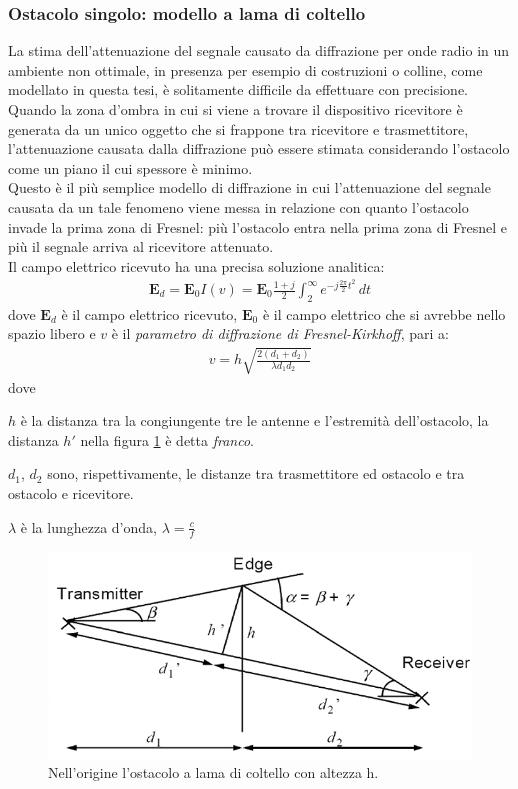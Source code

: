 \subsubsection*{Ostacolo singolo: modello a lama di coltello}
La stima dell’attenuazione del segnale causato da diffrazione per onde radio in un ambiente non ottimale, in presenza per esempio di 
costruzioni o colline, come modellato in questa tesi, è solitamente difficile da effettuare con precisione. Quando la zona d'ombra in 
cui si viene a trovare il dispositivo ricevitore è generata da un unico oggetto che si frappone tra ricevitore e trasmettitore, 
l'attenuazione causata dalla diffrazione può essere stimata considerando l'ostacolo come un piano il cui spessore è minimo. \\
Questo è il più semplice modello di diffrazione in cui l'attenuazione del segnale causata da un tale fenomeno viene messa in relazione 
con quanto l'ostacolo invade la prima zona di Fresnel: più l'ostacolo entra nella prima zona di Fresnel e più il segnale arriva al 
ricevitore attenuato. \\
Il campo elettrico ricevuto ha una precisa soluzione analitica:
\begin{align}
\mathbf{E}_{d} = \mathbf{E}_{0} I(v) = \mathbf{E}_{0} \frac{1+j}{2} \int_{2}^{\infty} e^{-j \frac{2 \pi}{2} t^{2}}\, dt
\label{eq:ed}
\end{align}
dove $\mathbf{E}_{d}$ è il campo elettrico ricevuto, $\mathbf{E}_{0}$ è il campo elettrico che si avrebbe nello spazio libero e $v$ è
il \emph{parametro di diffrazione di Fresnel-Kirkhoff}, pari a:
\begin{align*}
 \label{eq:parametrodiffrazione}
 v = h \sqrt{\frac{2(d_{1} + d_{2})}{\lambda d_{1} d_{2}}}
\end{align*}
dove
\begin{description}
\item $h$ è la distanza tra la congiungente tre le antenne e l'estremità dell'ostacolo, la distanza $h'$ nella figura \ref{img:knifeedge}
è detta \emph{franco}.
\item $d_{1}$, $d_{2}$ sono, rispettivamente, le distanze tra trasmettitore ed ostacolo e tra ostacolo e ricevitore.
\item $\lambda$ è la lunghezza d'onda, $\lambda = \frac{c}{f}$
\end{description}
\begin{figure}[!h]
\centering
\includegraphics[height=0.5\textwidth]{Immagini/knifeedge}
\caption{Nell'origine l'ostacolo a lama di coltello con altezza h.}
\label{img:knifeedge}
\end{figure}

